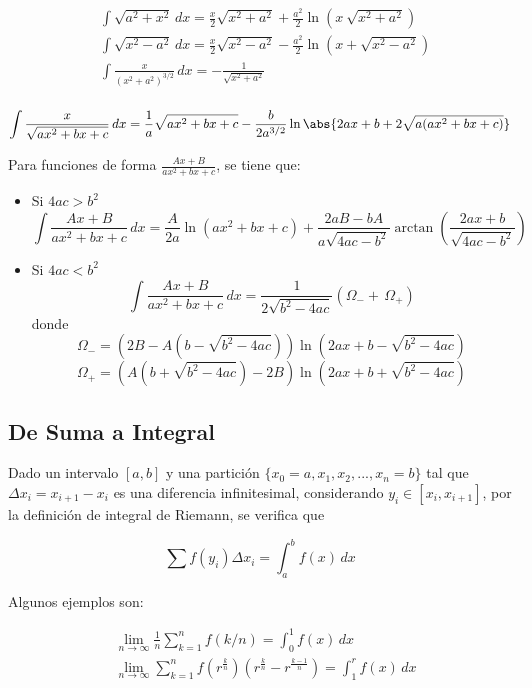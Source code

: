 \begin{minipage}{0.55\textwidth}
\begin{equation}
\begin{split}
    &\int\sqrt{a^2+x^2}\,dx = \frac{x}{2}\sqrt{x^2+a^2}+\frac{a^2}{2}\ln{(x~\sqrt{x^2+a^2})}\\
    &\int\sqrt{x^2-a^2}\,dx = \frac{x}{2}\sqrt{x^2-a^2}-\frac{a^2}{2}\ln{(x+\sqrt{x^2-a^2})}\\
    &\int\frac{x}{(x^2+a^2)^{3/2}}\,dx = -\frac{1}{\sqrt{x^2 + a^2}}\\
\end{split}
\nonumber
\end{equation}
\end{minipage}

\[\int\frac{x}{\sqrt{ax^2 + bx +c}}\,dx = \frac{1}{a}\sqrt{ax^2 +bx +c} - \frac{b}{2a^{3/2}}\ln{\abs{2ax +b+2\sqrt{a(ax^2+bx+c)}}}\]
\bigbreak

\bigbreak
Para funciones de forma $\frac{Ax+B}{ax^2+bx+c}$, se tiene que:

\begin{itemize}
    \item Si $4ac>b^2$
    \[\int\frac{Ax+B}{ax^2+bx+c}\,dx = \frac{A}{2a}\ln{(ax^2+bx+c)}+\frac{2aB-bA}{a\sqrt{4ac-b^2}}\arctan{\left(\frac{2ax+b}{\sqrt{4ac-b^2}}\right)}\]
    \item Si $4ac<b^2$ %
    \[\int\frac{Ax+B}{ax^2+bx+c}\,dx = \frac{1}{2\sqrt{b^2-4ac}}
    \left(\Omega_{-}+\,\Omega_{+}\right)\]
    donde
    \[\Omega_{-} = (2B-A(b-\sqrt{b^2-4ac}))\ln{(2ax+b-\sqrt{b^2-4ac})}\]
    \[\Omega_{+} = (A(b+\sqrt{b^2-4ac})-2B)\ln{(2ax+b+\sqrt{b^2-4ac})}\]
\end{itemize}

\subsection{De Suma a Integral}

Dado un intervalo $[a, b]$ y una partición $\{x_0=a, x_1, x_2, ..., x_n=b\}$ tal que $\Delta x_i = x_{i+1}-x_i$ es una diferencia infinitesimal, considerando $y_i\in [x_i, x_{i+1}]$, por la definición de integral de Riemann, se verifica que

\[\sum f(y_i)\Delta x_i = \int^b_af(x)\,dx\]

Algunos ejemplos son:

\begin{equation}
\begin{split}
    &\lim_{n\to\infty}\frac{1}{n}\sum^n_{k=1}f(k/n)=\int^1_0f(x)\,dx\\
    &\lim_{n\to\infty}\sum^n_{k=1}f(r^{\frac{k}{n}})
    (r^{\frac{k}{n}}-r^{\frac{k-1}{n}})=\int^r_1f(x)\,dx\\
\end{split}
\nonumber
\end{equation}

